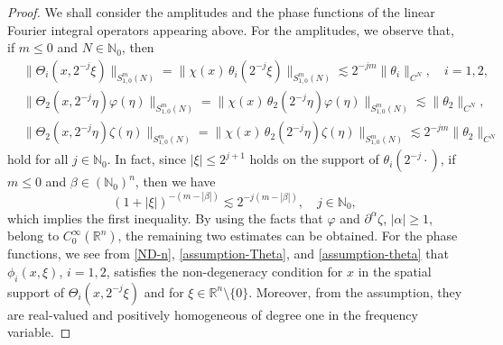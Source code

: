 \documentclass[12pt]{amsart}
\numberwithin{equation}{section}
\theoremstyle{plain}
\theoremstyle{definition}
\newcommand{\N}{\mathbb{N}}
\newcommand{\R}{\mathbb{R}}
\newcommand{\supp}{\mathrm{supp}\, }
\begin{document}
\begin{proof}
We shall consider the amplitudes and the phase functions
of the linear Fourier integral operators
appearing above.
For the amplitudes,
we observe that,
if $m \le 0$ and $N \in \N_{0}$,
then
\begin{align*}&
\| \Theta_{i}(x, 2^{-j} \xi) \|_{ S_{1,0}^{m} (N) }
=
\| \chi(x) \, \theta_i (2^{-j} \xi ) \|_{ S_{1,0}^{m} (N) }
\lesssim 
2^{-j m} \| \theta_i \|_{C^N},
\quad
i=1,2,
\\&
\| \Theta_{2} (x, 2^{-j} \eta) \varphi(\eta) \|_{ S_{1,0}^{m} (N) }
=
\| \chi(x) \, \theta_2 (2^{-j} \eta ) \varphi (\eta) \|_{ S_{1,0}^{m} (N) }
\lesssim 
\| \theta_2 \|_{C^N},
\\&
\| \Theta_{2} (x, 2^{-j} \eta) \zeta(\eta) \|_{ S_{1,0}^{m} (N) }
=
\| \chi(x) \, \theta_2 (2^{-j} \eta ) \zeta(\eta) \|_{ S_{1,0}^{m} (N) }
\lesssim 
2^{-j m} \| \theta_2 \|_{C^N} 
\end{align*}
hold for all $j \in \N_0$.
In fact, 
since $|\xi| \le 2^{j+1}$ holds
on the support of $\theta_{i} (2^{-j} \cdot)$,
if $m \le 0$ and $\beta \in (\N_{0})^n$,
then we have
\[ 
( 1+ |\xi| )^{-(m-|\beta|)} \lesssim 2^{-j(m-|\beta|)} ,
\quad j \in \N_{0},
\]
which implies the first inequality.
By using the facts that
$\varphi$ and $\partial^{\alpha} \zeta$,
$|\alpha| \ge 1$, belong to $C^{\infty}_{0} (\R^n)$,
the remaining two estimates
can be obtained.
For the phase functions,
we see 
from \eqref{ND-n}, \eqref{assumption-Theta},
and \eqref{assumption-theta}
that
$\phi_{i} (x, \xi)$, $i = 1,2$, 
satisfies the non-degeneracy condition
for $x$ in the spatial support of 
$\Theta_{i} (x, 2^{-j} \xi)$ 
and 
for $\xi \in \R^n \setminus \{0\}$.
Moreover, from the assumption,
they are real-valued and 
positively homogeneous of degree one 
in the frequency variable.



\end{proof}
\end{document}
